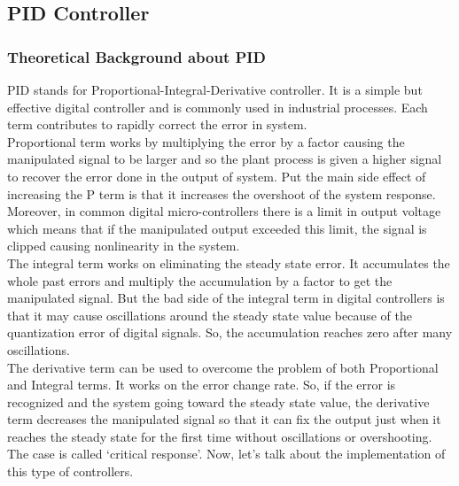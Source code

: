 \documentclass[12pt]{article}
\begin{document}
	\subsection{PID Controller}
	
	\subsubsection{Theoretical Background about PID}
	PID stands for Proportional-Integral-Derivative controller. It is a simple but effective digital controller and is commonly used in industrial processes. Each term contributes to rapidly correct the error in system. \\
	Proportional term works by multiplying the error by a factor causing the manipulated signal to be larger and so the plant process is given a higher signal to recover the error done in the output of system. Put the main side effect of increasing the P term is that it increases the overshoot of the system response. Moreover, in common digital micro-controllers there is a limit in output voltage which means that if the manipulated output exceeded this limit, the signal is clipped causing nonlinearity in the system.\\ 
	The integral term works on eliminating the steady state error. It accumulates the whole past errors and multiply the accumulation by a factor to get the manipulated signal. But the bad side of the integral term in digital controllers is that it may cause oscillations around the steady state value because of the quantization error of digital signals. So, the accumulation reaches zero after many oscillations.\\
	The derivative term can be used to overcome the problem of both Proportional and Integral terms. It works on the error change rate. So, if the error is recognized and the system going toward the steady state value, the derivative term decreases the manipulated signal so that it can fix the output just when it reaches the steady state for the first time without oscillations or overshooting. The case is called ‘critical response’. Now, let’s talk about the implementation of this type of controllers.
	
	
\end{document}
